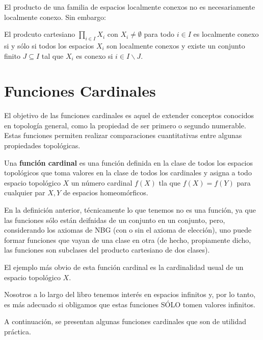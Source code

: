 \documentclass[12pt]{report}
\theoremstyle{largebreak}
\begin{document}
    El producto de una familia de espacios localmente conexos no es necesariamente localmente conexo. Sin embargo:

    \begin{theor}
        El prodcuto cartesiano $\prod_{i\in I}X_i$ con $X_i\neq\emptyset$ para todo $i\in I$ es localmente conexo si y sólo si todos los espacios $X_i$ son localmente conexos y existe un conjunto finito $J\subseteq I$ tal que $X_i$ es conexo si $i\in I\backslash J$.
    \end{theor}

    \chapter{Funciones Cardinales}

     El objetivo de las funciones cardinales es aquel de extender conceptos conocidos en topología general, como la propiedad de ser primero o segundo numerable. Estas funciones permiten realizar comparaciones cuantitativas entre algunas propiedades topológicas.
     
    \begin{mydef}
        Una \textbf{función cardinal} es una función definida en la clase de todos los espacios topológicos que toma valores en la clase de todos los cardinales y asigna a todo espacio topológico $X$ un número cardinal $f(X)$ tla que $f(X)=f(Y)$ para cualquier par $X,Y$ de espacios homeomórficos.
    \end{mydef}

    \begin{obs}
        En la definición anterior, técnicamente lo que tenemos no es una función, ya que las funciones sólo están deifnidas de un conjunto en un conjunto, pero, considerando los axiomas de NBG (con o sin el axioma de elección), uno puede formar funciones que vayan de una clase en otra (de hecho, propiamente dicho, las funciones son subclases del producto cartesiano de dos clases).
    \end{obs}

    \begin{exa}
        El ejemplo más obvio de esta función cardinal es la cardinalidad usual de un espacio topológico $X$.
    \end{exa}

    Nosotros a lo largo del libro tenemos interés en espacios infinitos y, por lo tanto, es más adecuado si obligamos que estas funciones SÓLO tomen valores infinitos.

    A continuación, se presentan algunas funciones cardinales que son de utilidad práctica.
        
\end{document}
